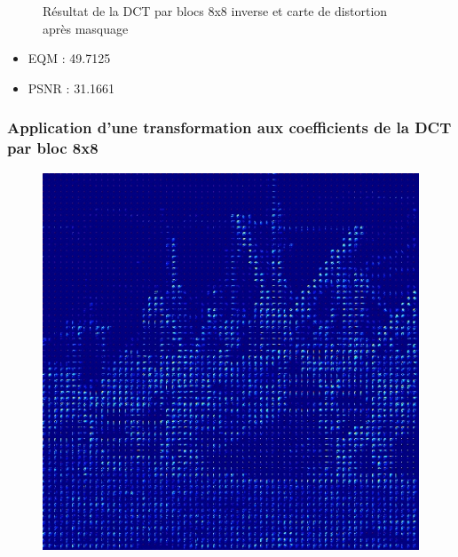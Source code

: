 \documentclass[12pt]{report}
\begin{document}
\begin{figure}[H]
\begin{center}
\caption{Résultat de la DCT par blocs 8x8 inverse et carte de distortion après masquage}
\end{center}
\end{figure}

\begin{itemize}
\item EQM : 49.7125
\item PSNR : 31.1661
\end{itemize}

\subsubsection{Application d'une transformation aux coefficients de la DCT par bloc 8x8}

\begin{figure}[H]
\begin{center}
\includegraphics[scale=0.25]{../ImageRes/blockdct_transform_0.jpg} 

\end{center}
\end{figure}
\end{document}
